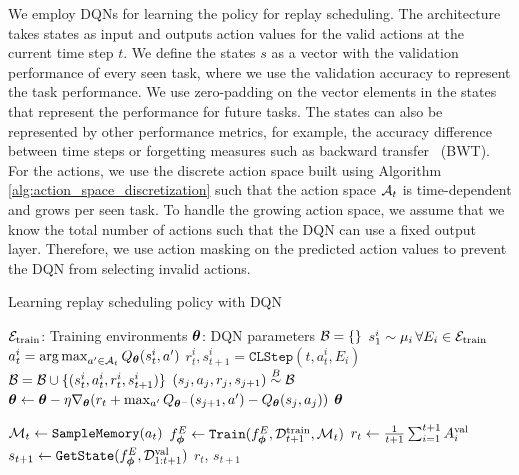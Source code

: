 We employ DQNs for learning the policy for replay scheduling. The architecture takes states as input and outputs action values for the valid actions at the current time step $t$. We define the states $s$ as a vector with the validation performance of every seen task, where we use the validation accuracy to represent the task performance. We use zero-padding on the vector elements in the states that represent the performance for future tasks. The states can also be represented by other performance metrics, for example, the accuracy difference between time steps or forgetting measures such as backward transfer~\cite{lopez2017gradient} (BWT). For the actions, we use the discrete action space built using Algorithm \ref{alg:action_space_discretization} such that the action space ${\mathcal{A}}_t$ is time-dependent and grows per seen task. To handle the growing action space, we assume that we know the total number of actions such that the DQN can use a fixed output layer. Therefore, we use action masking on the predicted action values to prevent the DQN from selecting invalid actions. 

\begin{algorithm}[t]
	\caption{Learning replay scheduling policy with DQN}
	\label{alg:learning_replay_scheduling_policy_with_dqn}
	\begin{algorithmic}[1]
		\Require ${\mathcal{E}}_{{\text{train}}}$: Training environments
		\Require ${\bm{\theta}}$: DQN parameters
		\State ${\mathcal{B}} = \{\}$ 
		\State $s_1^{i} \sim \mu_i \, \forall E_i \in {\mathcal{E}}_{{\text{train}}}$ 
		\State $a_t^{i} = \operatorname*{arg\,max}_{a' \in {\mathcal{A}}_t} Q_{{\bm{\theta}}}(s_t^{i}, a')$ 
		\State $r_t^{i}, s_{t+1}^{i} = \texttt{CLStep}(t, a_t^{i}, E_i)$
		\State ${\mathcal{B}} = {\mathcal{B}} \cup \{(s_{t}^{i}, a_{t}^{i}, r_{t}^{i}, s_{t+1}^{i})\}$ 
		\State $(s_j, a_j, r_j, s_{j+1}) \stackrel{B}{\sim} {\mathcal{B}}$ 					
		\State ${\bm{\theta}} \leftarrow {\bm{\theta}} - \eta \nabla_{{\bm{\theta}}} (r_t + \max_{a'} Q_{{\bm{\theta}}^{-}}(s_{j+1}, a') - Q_{{\bm{\theta}}}(s_j, a_j))$ 
		\EndFor
		\EndFor 
		\EndFor
		\State \Return ${\bm{\theta}}$ 
		
		\Statex
		
		\State ${\mathcal{M}}_t \leftarrow \texttt{SampleMemory}(a_t)$ 
		\State $f_{{\bm{\phi}}}^{E} \leftarrow \texttt{Train}(f_{{\bm{\phi}}}^{E}, {\mathcal{D}}_{t+1}^{{\text{train}}}, {\mathcal{M}}_t)$ 
		\State $r_t \leftarrow \frac{1}{t+1} \sum_{i=1}^{t+1} A_{i}^{{\text{val}}}$ 
		\State $s_{t+1} \leftarrow \texttt{GetState}(f_{{\bm{\phi}}}^{E}, {\mathcal{D}}_{1:t+1}^{{\text{val}}})$ 
		\State \Return $r_t$, $s_{t+1}$ 
		\EndFunction
	\end{algorithmic}
\end{algorithm}

